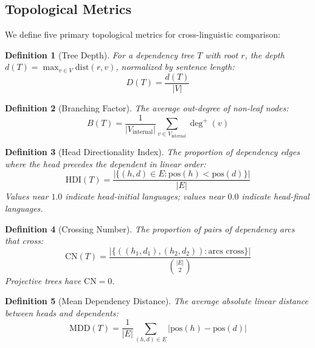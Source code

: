 \documentclass[11pt,a4paper]{article}
\newtheorem{definition}{Definition}
\begin{document}
\subsection{Topological Metrics}
\label{sec:metrics}

We define five primary topological metrics for cross-linguistic
comparison:

\begin{definition}[Tree Depth]
  For a dependency tree $T$ with root $r$, the depth
  $d(T) = \max_{v \in V} \mathrm{dist}(r, v)$, normalized by sentence
  length:
  \begin{equation}
    D(T) = \frac{d(T)}{|V|}
  \end{equation}
\end{definition}

\begin{definition}[Branching Factor]
  The average out-degree of non-leaf nodes:
  \begin{equation}
    B(T) = \frac{1}{|V_{\mathrm{internal}}|}
    \sum_{v \in V_{\mathrm{internal}}} \deg^+(v)
  \end{equation}
\end{definition}

\begin{definition}[Head Directionality Index]
  The proportion of dependency edges where the head precedes the
  dependent in linear order:
  \begin{equation}
    \mathrm{HDI}(T) =
    \frac{|\{(h,d) \in E : \mathrm{pos}(h) < \mathrm{pos}(d)\}|}{|E|}
  \end{equation}
  Values near $1.0$ indicate head-initial languages; values near $0.0$
  indicate head-final languages.
\end{definition}

\begin{definition}[Crossing Number]
  The proportion of pairs of dependency arcs that cross:
  \begin{equation}
    \mathrm{CN}(T) =
    \frac{|\{((h_1,d_1),(h_2,d_2)) : \text{arcs cross}\}|}{\binom{|E|}{2}}
  \end{equation}
  Projective trees have $\mathrm{CN} = 0$.
\end{definition}

\begin{definition}[Mean Dependency Distance]
  The average absolute linear distance between heads and dependents:
  \begin{equation}
    \mathrm{MDD}(T) = \frac{1}{|E|}
    \sum_{(h,d) \in E} |\mathrm{pos}(h) - \mathrm{pos}(d)|
  \end{equation}
\end{definition}
\end{document}
